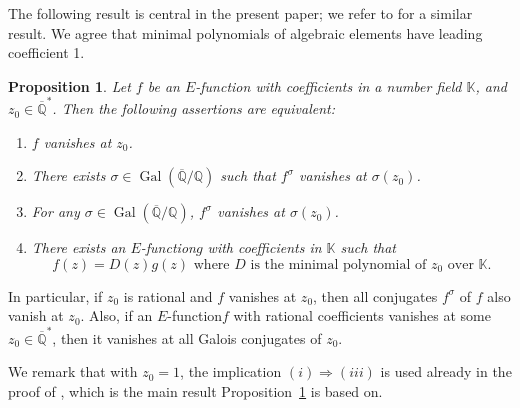 \documentclass[JEP,XML,SOM,Unicode,published]{cedram}
\newenvironment{enumeratei}
{\bgroup\def\theenumi{\roman{enumi}}\def\theenumii{\arabic{enumii}}\begin{enumerate}}
{\end{enumerate}\egroup}
\newcommand{\Efunction}{$E$\nobreakdash-func\-tion\xspace}
\newtheorem{prop}{Proposition}
\theoremstyle{definition}
\newcommand{\Q}{\mathbb{Q}}
\newcommand{\K}{\mathbb{K}}
\newcommand{\Qbar}{\overline{\mathbb Q}}
\DeclareMathOperator{\Gal}{Gal}
\begin{document}
The following result is central in the present paper; we refer to \cite[Prop.\,3.5]{BRS2} for a similar result. We agree that minimal polynomials of algebraic elements have leading coefficient 1.

\begin{prop}\label{prop1} Let $f$ be an \Efunction with coefficients in a number field $\K$, and $z_0\in \Qbar^\ast$. Then the following assertions are equivalent:
\begin{enumeratei}
\item\label{prop1i}
$f$ vanishes at $ z_0 $.
\item\label{prop1ii}
There exists $\sigma \in\Gal(\Qbar/\Q)$ such that $f^\sigma $ vanishes at $ \sigma(z_0) $.
\item\label{prop1iii}
For any $\sigma \in\Gal(\Qbar/\Q)$, $f^\sigma $ vanishes at $ \sigma(z_0) $.
\item\label{prop1iv}
There exists an \Efunction $g$ with coefficients in $\K$ such that
\[
f(z) = D(z) g(z) \mbox{ where $D$ is the minimal polynomial of $z_0$ over $\K$.}
\]
\end{enumeratei}
\end{prop}

In particular, if $z_0$ is rational and $f$ vanishes at $z_0$, then all conjugates $f^\sigma$ of $f$ also vanish at $z_0$.
Also, if an \Efunction $f$ with rational coefficients vanishes at some $z_0\in \Qbar^\ast$, then it vanishes at all Galois conjugates of $z_0$.

We remark that with $z_0=1$, the implication $(i)\Rightarrow (iii)$ is used already in the proof of \cite[Prop.\,4.1]{beukers}, which is the main result Proposition~\ref{prop1} is based on.
\end{document}
